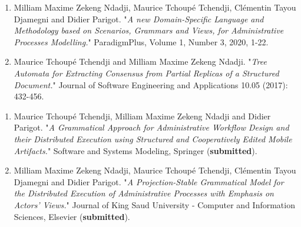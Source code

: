 \label{appendice2:article-appendice}
\mySaveMarks
{}
\begin{enumerate}
	\item Milliam Maxime Zekeng Ndadji, Maurice Tchoup{\'e} Tchendji, Cl{\'e}mentin Tayou Djamegni and Didier Parigot. "\textit{A new Domain-Specific Language and Methodology based on Scenarios, Grammars and Views, for Administrative Processes Modelling.}" ParadigmPlus, Volume 1, Number 3, 2020, 1-22.
	\item Maurice Tchoup{\'e} Tchendji and Milliam Maxime Zekeng Ndadji. "\textit{Tree Automata for Extracting Consensus from Partial Replicas of a Structured Document.}" Journal of Software Engineering and Applications 10.05 (2017): 432-456.
\end{enumerate}

\begin{enumerate}
	\item Maurice Tchoup{\'e} Tchendji, Milliam Maxime Zekeng Ndadji and Didier Parigot. "\textit{A Grammatical Approach for Administrative Workflow Design and their Distributed Execution using Structured and Cooperatively Edited Mobile Artifacts.}" Software and Systems Modeling, Springer (\textbf{submitted}).
	\item Milliam Maxime Zekeng Ndadji, Maurice Tchoup{\'e} Tchendji, Cl{\'e}mentin Tayou Djamegni and Didier Parigot. "\textit{A Projection-Stable Grammatical Model for the Distributed Execution of Administrative Processes with Emphasis on Actors' Views.}" Journal of King Saud University - Computer and Information Sciences, Elsevier (\textbf{submitted}).
\end{enumerate}


